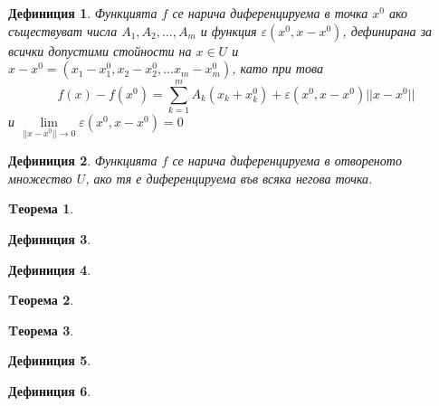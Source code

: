 \documentclass[fleqn]{article}
\newtheorem{theorem}{Tеорема}[subsection]
\newtheorem{definition}{Дефиниция}[subsection]
\begin{document}
\begin{definition}
Функцията $f$ се нарича диференцируема в точка $x^0$ ако съществуват числа $A_1, A_2, ..., A_m$ и функция $\varepsilon (x^0, x - x^0)$, дефинирана за всички допустими стойности на $x \in U$ и $x - x^0 = (x_1 - x_1 ^0, x_2 - x_2 ^0,... x_m - x_m ^0)$, като при това 
$$f(x) - f(x^0) = \sum_{k=1}^{m} A_k(x_k + x_k ^ 0) + \varepsilon (x^0, x - x^0) ||x - x^0||$$ 
и $\lim\limits_{|| x - x^0|| \rightarrow 0}\varepsilon (x^0, x - x^0) = 0$
\end{definition}

\begin{definition}
Функцията $f$ се нарича диференцируема в отвореното множество $U$, ако тя е диференцируема във всяка негова точка. 
\end{definition}

\begin{theorem}

\end{theorem}

\begin{definition}

\end{definition}

\begin{definition}

\end{definition}

\begin{theorem}

\end{theorem}

\begin{theorem}

\end{theorem}

\begin{definition}

\end{definition}

\begin{definition}

\end{definition}
\end{document}
